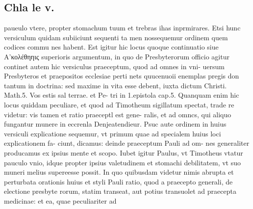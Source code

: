 \documentclass{article}
\begin{document}
\begin{pages}
\section*{Chla le v. }
\marginpar{[ p.113 ]}\pstart paueulo vtere, propter stomachum tuum et trebras ihas inprmirares.  \pend\pstart Etsi hunc versiculum quidam subiiciunt sequenti ta men nossequemur ordinem quem codices commu nes habent. Est igitur hic locus quoque continuatio siue Α’κολέθηηις superioris argumentum, in quo de Presbyterorum officio agitur continet autem hic versiculus praeceptum, quod ad omnes in vni- uersum Presbyteros et praepositos ecclesiae perti nets quucenuoii enemplas pregis don tantum in doctrina: sed maxime in vita esse debent, iuxta dictum Christi. Math.5. Vos estis sal terrae. et Pe- tri in 1.epistola cap.5.  \pend\pstart Quanquam enim hic locus quiddam peculiare, et quod ad Timotheum sigillatum spectat, trade re videtur: vis tamen et ratio praeceptl est gene- ralis, et ad omncs, qui aliquo fungantur munere in eccrenla Denjeatendieur. Psuc aute ordinem in huius versiculi explicatione sequemur, vt primum quae ad specialem huius loci explicationem fa- ciunt, dicamus: deinde praeceptum Pauli ad om- nes generaliter producamus ex ipsius mente et scopo.  \pend\pstart Iubet igitur Paulus, vt Timotheus vtatur pauculo vnio, idque propter ipsius valetudinem et stomachi debilitatem, vt suo muneri melius supereesse possit.  \pend\pstart In quo quibusdam videtur nimis abrupta et perturbata orationis huius et styli Pauli ratio, quod a praecepto generali, de electione presbyte rorum, statim transeat, aut potius transuolet ad praecepta medicinae: et ea, quae peculiariter ad  \pend

\end{pages}
\end{document}
